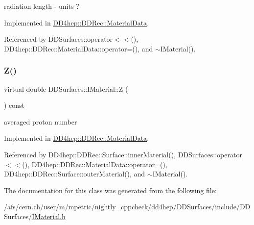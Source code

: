 radiation length -\/ units ? 



Implemented in \hyperlink{class_d_d4hep_1_1_d_d_rec_1_1_material_data_ae0160490acc99fb7b880f687c70f1ec8}{D\+D4hep\+::\+D\+D\+Rec\+::\+Material\+Data}.



Referenced by D\+D\+Surfaces\+::operator$<$$<$(), D\+D4hep\+::\+D\+D\+Rec\+::\+Material\+Data\+::operator=(), and $\sim$\+I\+Material().

\hypertarget{class_d_d_surfaces_1_1_i_material_a3e5d3e85db97ff9edb25a073109a14b0}{}\label{class_d_d_surfaces_1_1_i_material_a3e5d3e85db97ff9edb25a073109a14b0} 
\subsubsection{\texorpdfstring{Z()}{Z()}}
{\footnotesize\ttfamily virtual double D\+D\+Surfaces\+::\+I\+Material\+::Z (\begin{DoxyParamCaption}{ }\end{DoxyParamCaption}) const\hspace{0.3cm}{\ttfamily [pure virtual]}}



averaged proton number 



Implemented in \hyperlink{class_d_d4hep_1_1_d_d_rec_1_1_material_data_a8200577f3cab334549373e0dfcc3db3a}{D\+D4hep\+::\+D\+D\+Rec\+::\+Material\+Data}.



Referenced by D\+D4hep\+::\+D\+D\+Rec\+::\+Surface\+::inner\+Material(), D\+D\+Surfaces\+::operator$<$$<$(), D\+D4hep\+::\+D\+D\+Rec\+::\+Material\+Data\+::operator=(), D\+D4hep\+::\+D\+D\+Rec\+::\+Surface\+::outer\+Material(), and $\sim$\+I\+Material().



The documentation for this class was generated from the following file\+:\begin{DoxyCompactItemize}
\item 
/afs/cern.\+ch/user/m/mpetric/nightly\+\_\+cppcheck/dd4hep/\+D\+D\+Surfaces/include/\+D\+D\+Surfaces/\hyperlink{_i_material_8h}{I\+Material.\+h}\end{DoxyCompactItemize}
